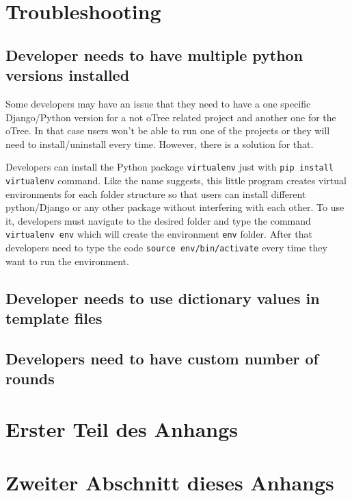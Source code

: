 \begin{appendix}
\section{Troubleshooting}

\subsection{Developer needs to have multiple python versions installed}

Some developers may have an issue that they need to have a one specific Django/Python version for a not oTree related project and another one for the oTree. In that case users won't be able to run one of the projects or they will need to install/uninstall every time. However, there is a solution for that. 

Developers can install the Python package \verb|virtualenv| just with \verb|pip install virtualenv| command. Like the name suggests, this little program creates virtual environments for each folder structure so that users can install different python/Django or any other package without interfering with each other. To use it, developers must navigate to the desired folder and type the command \verb|virtualenv env| which will create the environment \verb|env| folder. After that developers need to type the code \verb|source env/bin/activate| every time they want to run the environment. 

\subsection{Developer needs to use dictionary values in template files}

\subsection{Developers need to have custom number of rounds}

\section{Erster Teil des Anhangs}

\section{Zweiter Abschnitt dieses Anhangs}

\end{appendix}




